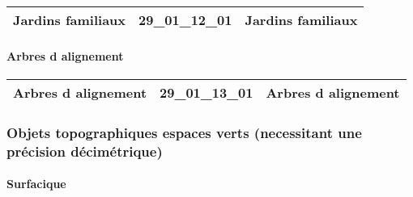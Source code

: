 \documentclass[12pt,titlepage]{book}
\begin{document}
\renewcommand{\arraystretch}{1.2}
\begin{supertabular}{|p{10cm}|c|p{15cm}|}
 Jardins familiaux & 29\_01\_12\_01 & Jardins familiaux\\
\hline
\end{supertabular}


\paragraph{Arbres d alignement}
\noindent
\vspace{\baselineskip}

\renewcommand{\arraystretch}{1.2}
\begin{supertabular}{|p{10cm}|c|p{15cm}|}
 Arbres d alignement & 29\_01\_13\_01 & Arbres d alignement\\
\hline
\end{supertabular}

\subsubsection{\large Objets topographiques espaces verts (necessitant une précision décimétrique)}
\paragraph{Surfacique}
\noindent
\vspace{\baselineskip}
\end{document}
